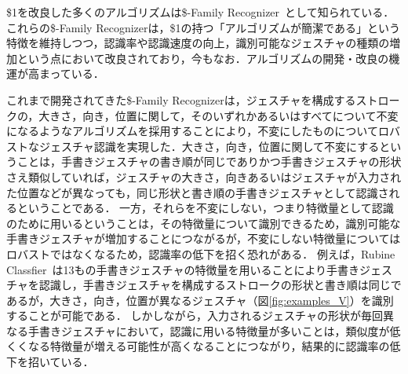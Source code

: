 \$1を改良した多くのアルゴリズムは\$-Family Recognizer~\cite{Anthony:2010:LMR:1839214.1839258,Reaver:2011:MQU:2021164.2021183,Li:2010:PFA:1753326.1753654,Anthony:2012:NFA:2305276.2305296,Herold:2012:CRF:2331067.2331074,Vatavu:2012:GPC:2388676.2388732,Taranta:2015:PPB:2788890.2788925,Pittman:2016:FFA:2856767.2856808,Vatavu:2012:OAF:2166966.2167022}として知られている．これらの\$-Family Recognizerは，\$1の持つ「アルゴリズムが簡潔である」という特徴を維持しつつ，認識率や認識速度の向上，識別可能なジェスチャの種類の増加という点において改良されており，今もなお．アルゴリズムの開発・改良の機運が高まっている．

これまで開発されてきた\$-Family Recognizerは，ジェスチャを構成するストロークの，大きさ，向き，位置に関して，そのいずれかあるいはすべてについて不変になるようなアルゴリズムを採用することにより，不変にしたものについてロバストなジェスチャ認識を実現した．大きさ，向き，位置に関して不変にするということは，手書きジェスチャの書き順が同じでありかつ手書きジェスチャの形状さえ類似していれば，ジェスチャの大きさ，向きあるいはジェスチャが入力された位置などが異なっても，同じ形状と書き順の手書きジェスチャとして認識されるということである．%
一方，それらを不変にしない，つまり特徴量として認識のために用いるということは，その特徴量について識別できるため，識別可能な手書きジェスチャが増加することにつながるが，不変にしない特徴量についてはロバストではなくなるため，認識率の低下を招く恐れがある．
例えば，Rubine Classfier~\cite{Rubine:1991:SGE:122718.122753}は13もの手書きジェスチャの特徴量を用いることにより手書きジェスチャを認識し，手書きジェスチャを構成するストロークの形状と書き順は同じであるが，大きさ，向き，位置が異なるジェスチャ（図\ref{fig:examples_V}）を識別することが可能である．
しかしながら，入力されるジェスチャの形状が毎回異なる手書きジェスチャにおいて，認識に用いる特徴量が多いことは，類似度が低くくなる特徴量が増える可能性が高くなることにつながり，結果的に認識率の低下を招いている．

